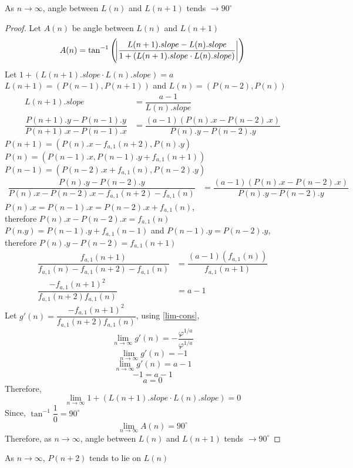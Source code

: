 \documentclass[preprint,12pt]{elsarticle}
\begin{document}
	As $n \to \infty$, angle between $L(n)$ and $L(n+1)$ tends $\to 90^\circ$

\begin{proof}
	Let $A(n)$ be angle between $L(n)$ and $L(n+1)$
	$$A(n) = \tan^{-1}\left({\abs{\dfrac{L(n+1).slope-L(n).slope}{1+(L(n+1).slope \cdot L(n).slope)}}}\right)$$
	Let $1 + (L(n+1).slope \cdot L(n).slope) = a$\\
	$L(n+1) = (P(n-1), P(n+1))$ and $L(n) = (P(n-2), P(n))$
	\begin{align*}
	L(n+1).slope &= \dfrac{a - 1}{L(n).slope}\\
	\dfrac{P(n+1).y - P(n-1).y}{P(n+1).x - P(n-1).x} &= \dfrac{(a-1)(P(n).x-P(n-2).x)}{P(n).y-P(n-2).y}
	\end{align*}
	$P(n+1) = (P(n).x - f_{a,1}(n+2), P(n).y)$\\
	$P(n) = (P(n-1).x, P(n-1).y+f_{a,1}(n+1))$\\
	$P(n-1) = (P(n-2).x+f_{a,1}(n), P(n-2).y)$
	\begin{align*}
	\dfrac{P(n).y-P(n-2).y}{P(n).x-P(n-2).x-f_{a,1}(n+2)-f_{a,1}(n)} &= \dfrac{(a-1)(P(n).x-P(n-2).x)}{P(n).y-P(n-2).y}
	\end{align*}
	$P(n).x = P(n-1).x = P(n-2).x+f_{a,1}(n)$,\\ therefore $P(n).x-P(n-2).x=f_{a,1}(n)$\\
	$P(n.y) = P(n-1).y+f_{a,1}(n-1)$ and $P(n-1).y = P(n-2).y$,\\ therefore $P(n).y-P(n-2)=f_{a,1}(n+1)$
	\begin{align*}
	\dfrac{f_{a,1}(n+1)}{f_{a,1}(n)-f_{a,1}(n+2)-f_{a,1}(n)} &= \dfrac{(a-1)(f_{a,1}(n))}{f_{a,1}(n+1)}\\
	\dfrac{-f_{a,1}(n+1)^2}{f_{a,1}(n+2)f_{a,1}(n)} &= a - 1
	\end{align*}
	Let $g'(n) = \dfrac{-f_{a,1}(n+1)^2}{f_{a,1}(n+2)f_{a,1}(n)}$, using \ref{lim-cons},
	$$\lim_{n \to \infty}g'(n) = -\dfrac{\varphi^{1/a}}{\varphi^{1/a}}$$
	$$\lim_{n \to \infty}g'(n) = -1$$
	$$\lim_{n \to \infty}g'(n) = a - 1$$
	$$-1 = a - 1$$
	$$a = 0$$
	Therefore, $$\lim_{n \to \infty}1 + (L(n+1).slope \cdot L(n).slope) = 0$$
	Since, $\tan^{-1}{\dfrac{1}{0}} = 90^\circ$
	$$\lim_{n \to \infty} A(n) = 90^\circ$$
	Therefore, as $n \to \infty$, angle between $L(n)$ and $L(n+1)$ tends $\to 90^\circ$
\end{proof}

	As $n \to \infty$, $P(n+2)$ tends to lie on $L(n)$
\end{document}
